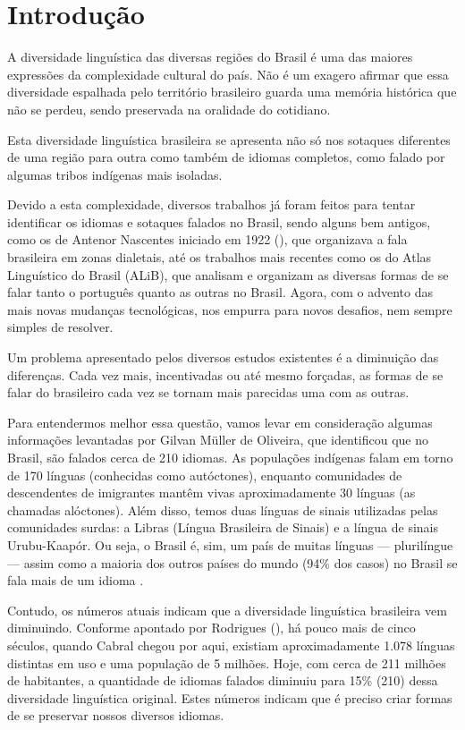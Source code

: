  \chapter{Introdução} %

\begin{flushleft}
A diversidade linguística das diversas regiões do Brasil é uma das maiores expressões da complexidade cultural do país. Não é um exagero afirmar que essa diversidade espalhada pelo território brasileiro guarda uma memória histórica que não se perdeu, sendo preservada na oralidade do cotidiano.

Esta diversidade linguística brasileira se apresenta não só nos sotaques diferentes de uma região para outra como também de idiomas completos, como falado por algumas tribos indígenas mais isoladas.

Devido a esta complexidade, diversos trabalhos já foram feitos para tentar identificar os idiomas e sotaques falados no Brasil, sendo alguns bem antigos, como os de Antenor Nascentes iniciado em 1922 (\citeyear{nascentes1953}), que organizava a fala brasileira em zonas dialetais, até os trabalhos mais recentes como os do Atlas Linguístico do Brasil (ALiB), que analisam e organizam as diversas formas de se falar tanto o português quanto as outras no Brasil. Agora, com o advento das mais novas mudanças tecnológicas, nos empurra para novos desafios, nem sempre simples de resolver.

Um problema apresentado pelos diversos estudos existentes é a diminuição das diferenças. Cada vez mais, incentivadas ou até mesmo forçadas, as formas de se falar do brasileiro cada vez se tornam mais parecidas uma com as outras.

Para entendermos melhor essa questão, vamos levar em consideração algumas informações levantadas por Gilvan Müller de Oliveira, que identificou que no Brasil, são falados cerca de 210 idiomas. As populações indígenas falam em torno de 170 línguas (conhecidas como autóctones), enquanto comunidades de descendentes de imigrantes mantêm vivas aproximadamente 30 línguas (as chamadas alóctones). Além disso, temos duas línguas de sinais utilizadas pelas comunidades surdas: a Libras (Língua Brasileira de Sinais) e a língua de sinais Urubu-Kaapór. Ou seja, o Brasil é, sim, um país de muitas línguas — plurilíngue — assim como a maioria dos outros países do mundo (94\% dos casos) no Brasil se fala mais de um idioma \cite{noauthor_plurilinguismo_nodate}.

Contudo, os números atuais indicam que a diversidade linguística brasileira vem diminuindo. Conforme apontado por Rodrigues (\citeyear{rodrigues_linguas_nodate}), há pouco mais de cinco séculos, quando Cabral chegou por aqui, existiam aproximadamente 1.078 línguas distintas em uso e uma população de 5 milhões. Hoje, com cerca de 211 milhões de habitantes, a quantidade de idiomas falados diminuiu para 15\% (210) dessa diversidade linguística original. Estes números indicam que é preciso criar formas de se preservar nossos diversos idiomas.


\end{flushleft}
